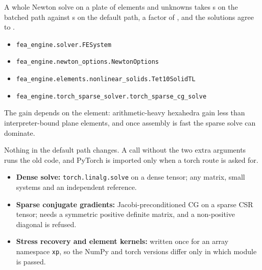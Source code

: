 \newpage\thispagestyle{hl}
\par
{}
\begin{hlheadline}A whole Newton solve on a plate of \cbkNewtonNE{} elements and \cbkNewtonN{} unknowns takes \cbkNewtonBatched{} s on the batched path against \cbkNewtonDefault{} s on the default path, a factor of \cbkNewtonRatio{}, and the solutions agree to \cbkNewtonDiff.\end{hlheadline}
{\begin{itemize}\setlength\itemsep{2pt}
\item \texttt{fea\_engine.solver.FESystem}
\item \texttt{fea\_engine.newton\_options.NewtonOptions}
\item \texttt{fea\_engine.elements.nonlinear\_solids.Tet10SolidTL}
\item \texttt{fea\_engine.torch\_sparse\_solver.torch\_sparse\_cg\_solve}
\end{itemize}}
\begin{hllimit}The gain depends on the element: arithmetic-heavy hexahedra gain less than interpreter-bound plane elements, and once assembly is fast the sparse solve can dominate.\end{hllimit}
\newpage\thispagestyle{hl}
\par
{}
\begin{hlquote}Nothing in the default path changes. A call without the two extra arguments runs the old code, and PyTorch is imported only when a torch route is asked for.\end{hlquote}
\begin{itemize}\setlength\itemsep{3pt}
\item \textbf{Dense solve:} \texttt{torch.linalg.solve} on a dense tensor; any matrix, small systems and an independent reference.
\item \textbf{Sparse conjugate gradients:} Jacobi-preconditioned CG on a sparse CSR tensor; needs a symmetric positive definite matrix, and a non-positive diagonal is refused.
\item \textbf{Stress recovery and element kernels:} written once for an array namespace \texttt{xp}, so the NumPy and torch versions differ only in which module is passed.
\end{itemize}

